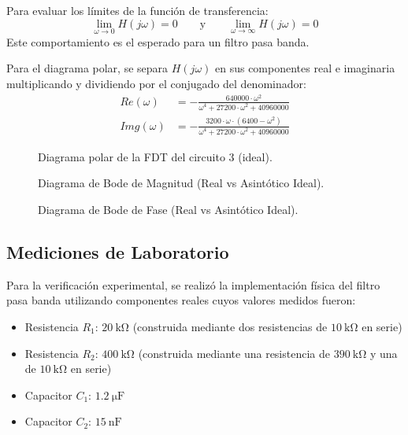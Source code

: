 Para evaluar los límites de la función de transferencia:
\begin{equation}
  \lim_{\omega \to 0} H(j\omega) = 0
  \qquad \text{y} \qquad
  \lim_{\omega \to \infty} H(j\omega) = 0
\end{equation}
Este comportamiento es el esperado para un filtro pasa banda.

Para el diagrama polar, se separa $H(j\omega)$ en sus componentes real e imaginaria multiplicando y dividiendo por el conjugado del denominador:
\begin{align}
  Re(\omega) &= - \frac{640000 \cdot \omega^2}{\omega^4 + 27200 \cdot \omega^2 + 40960000}\\
  Img(\omega) &= - \frac{3200 \cdot \omega \cdot (6400 - \omega^2)}{\omega^4 + 27200 \cdot \omega^2 + 40960000}
\end{align}

\begin{figure}[H]
  \centering
  
  \caption{Diagrama polar de la FDT del circuito 3 (ideal).}
  \label{fig:polar_circuito_3}
\end{figure}

\begin{figure}[H]
  \centering
  
  \caption{Diagrama de Bode de Magnitud (Real vs Asintótico Ideal).}
  \label{plot:bode_mag_circuito_3}
\end{figure}

\begin{figure}[H]
  \centering
  
  \caption{Diagrama de Bode de Fase (Real vs Asintótico Ideal).}
  \label{plot:bode_phase_circuito_3}
\end{figure}


\subsection{Mediciones de Laboratorio}
\label{sec:mediciones_circ_3}

Para la verificación experimental, se realizó la implementación física del filtro pasa banda utilizando componentes reales cuyos valores medidos fueron:
\begin{itemize}
  \item Resistencia $R_1$: $\SI{20}{\kilo\ohm}$ (construida mediante dos resistencias de $\SI{10}{\kilo\ohm}$ en serie)
  \item Resistencia $R_2$: $\SI{400}{\kilo\ohm}$ (construida mediante una resistencia de $\SI{390}{\kilo\ohm}$ y una de $\SI{10}{\kilo\ohm}$ en serie)
  \item Capacitor $C_1$: $\SI{1.2}{\micro\farad}$
  \item Capacitor $C_2$: $\SI{15}{\nano\farad}$
\end{itemize}

